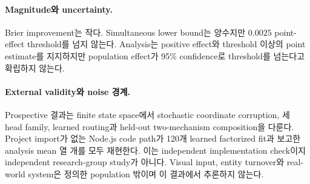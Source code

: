 \paragraph{Magnitude와 uncertainty.}
Brier improvement는 작다. Simultaneous lower bound는 양수지만 \(0.0025\)
point-effect threshold를 넘지 않는다. Analysis는 positive effect와 threshold
이상의 point estimate를 지지하지만 population effect가 95\% confidence로
threshold를 넘는다고 확립하지 않는다.

\paragraph{External validity와 noise 경계.}
Prospective 결과는 finite state space에서 stochastic coordinate corruption,
세 head family, learned routing과 held-out two-mechanism composition을 다룬다.
Project import가 없는 Node.js code path가 120개 learned factorized fit과 보고한
analysis mean 열 개를 모두 재현한다. 이는 independent implementation check이지
independent research-group study가 아니다. Visual input, entity turnover와
real-world system은 정의한 population 밖이며 이 결과에서 추론하지 않는다.
